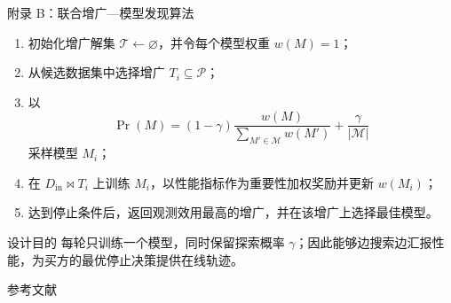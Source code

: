 \documentclass[10pt,aspectratio=169]{beamer}
\begin{document}
\begin{frame}{附录 B：联合增广—模型发现算法}
  \small
  \begin{enumerate}
    \item 初始化增广解集 $\mathcal T\leftarrow\varnothing$，并令每个模型权重 $w(M)=1$；
    \item 从候选数据集中选择增广 $T_i\subseteq\mathcal P$；
    \item 以
      \[
        \Pr(M)=(1-\gamma)\frac{w(M)}{\sum_{M'\in\mathcal M}w(M')}
        +\frac{\gamma}{|\mathcal M|}
      \]
      采样模型 $M_i$；
    \item 在 $D_{\mathrm{in}}\Join T_i$ 上训练 $M_i$，以性能指标作为重要性加权奖励并更新 $w(M_i)$；
    \item 达到停止条件后，返回观测效用最高的增广，并在该增广上选择最佳模型。
  \end{enumerate}
  \begin{alertblock}{设计目的}
    每轮只训练一个模型，同时保留探索概率 $\gamma$；因此能够边搜索边汇报性能，为买方的最优停止决策提供在线轨迹。
  \end{alertblock}
\end{frame}

\begin{frame}[allowframebreaks]{参考文献}
  \nocite{*}
  
  
\end{frame}
\end{document}
